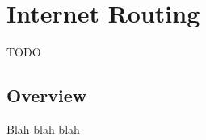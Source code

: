 \chapter{Internet Routing}
\label{cha:routing}


\ifdraft TODO
\section{Overview}

Blah blah blah
\fi



